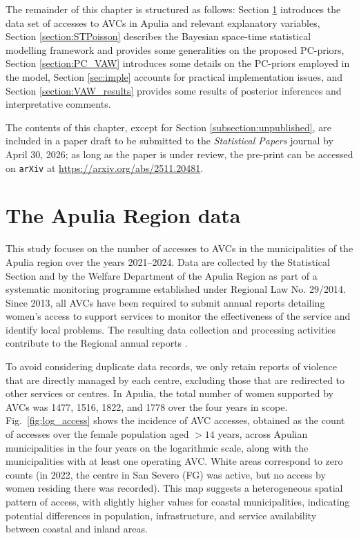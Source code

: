 \documentclass[openany, 11pt, oneside]{book}
\begin{document}
The remainder of this chapter is structured as follows: Section \ref{section:Apulia.data} introduces the data set of accesses to AVCs in Apulia and relevant explanatory variables, Section \ref{section:STPoisson} describes the Bayesian space-time statistical modelling framework and provides some generalities on the proposed PC-priors, Section \ref{section:PC_VAW} introduces some details on the PC-priors employed in the model, Section \ref{sec:imple} accounts for practical implementation issues, and Section \ref{section:VAW_results} provides some results of posterior inferences and interpretative comments.

The contents of this chapter, except for Section \ref{subsection:unpublished}, are included in a paper draft to be submitted to the \textit{Statistical Papers} journal by April 30, 2026; as long as the paper is under review, the pre-print can be accessed on \texttt{arXiv} at \url{https://arxiv.org/abs/2511.20481}.

\section{The Apulia Region data}\label{section:Apulia.data}

This study focuses on the number of accesses to AVCs in the municipalities of the Apulia region over the years 2021--2024. Data are collected by the Statistical Section and by the Welfare Department of the Apulia Region as part of a systematic monitoring programme established under Regional Law No. 29/2014. Since 2013, all AVCs have been required to submit annual reports detailing women’s access to support services to monitor the effectiveness of the service and identify local problems. The resulting data collection and processing activities contribute to the Regional annual reports \parencite{CAV2024report}.

To avoid considering duplicate data records, we only retain reports of violence that are directly managed by each centre, excluding those that are redirected to other services or centres. In Apulia, the total number of women supported by AVCs was 1477, 1516, 1822, and 1778 over the four years in scope.
%
Fig.~\ref{fig:log_access} shows the incidence of AVC accesses, obtained as the count of accesses over the female population aged $>14$ years, across Apulian municipalities in the four years on the logarithmic scale, along with the municipalities with at least one operating AVC. White areas correspond to zero counts (in 2022, the centre in San Severo (FG) was active, but no access by women residing there was recorded). This map suggests a heterogeneous spatial pattern of access, with slightly higher values for coastal municipalities, indicating potential differences in population, infrastructure, and service availability between coastal and inland areas.
\end{document}
